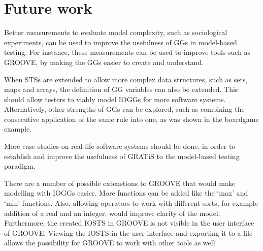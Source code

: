 \section{Future work}\label{sec:future-work}
Better measurements to evaluate model complexity, such as sociological experiments, can be used to improve the usefulness of GGs in model-based testing. For instance, these measurements can be used to improve tools such as GROOVE, by making the GGs easier to create and understand.

When STSs are extended to allow more complex data structures, such as sets, maps and arrays, the definition of GG variables can also be extended. This should allow testers to viably model IOGGs for more software systems. Alternatively, other strengths of GGs can be explored, such as combining the consecutive application of the same rule into one, as was shown in the boardgame example.

More case studies on real-life software systems should be done, in order to establish and improve the usefulness of GRATiS to the model-based testing paradigm.

There are a number of possible extenstions to GROOVE that would make modelling with IOGGs easier. More functions can be added like the `max' and `min' functions. Also, allowing operators to work with different sorts, for example addition of a real and an integer, would improve clarity of the model. Furthermore, the created IOSTS in GROOVE is not visible in the user interface of GROOVE. Viewing the IOSTS in the user interface and exporting it to a file allows the possibility for GROOVE to work with other tools as well.